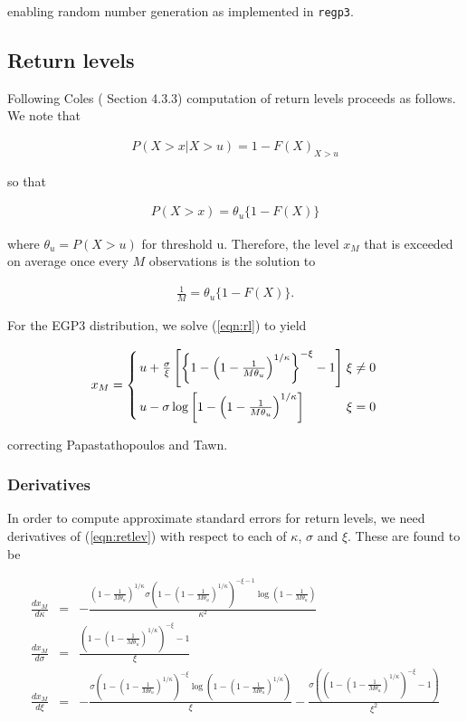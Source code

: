 \documentclass[a4paper]{article}\usepackage[]{graphicx}\usepackage[]{color}
\begin{document}
enabling random number generation as implemented in {\tt regp3}.

\subsection{Return levels}
Following Coles (\cite{coles} Section 4.3.3) computation of return levels proceeds
as follows. We note that

\begin{eqnarray*}
P(X > x | X > u) = 1 - F(X)_{X > u}
\end{eqnarray*}

so that

\begin{eqnarray*}
P(X > x) = \theta_u\{1 - F(X)\}
\end{eqnarray*}

where $\theta_u = P(X > u)$ for threshold u. Therefore, the level $x_M$ that is
exceeded on average once every $M$ observations is the solution to

\begin{eqnarray}
\frac{1}{M} = \theta_u\{1 - F(X)\} \label{eqn:rl}.
\end{eqnarray}

For the EGP3 distribution, we solve (\ref{eqn:rl}) to yield

\begin{eqnarray}
x_M = \left\{ \arraycolsep=1.4pt\def\arraystretch{2.2} %
      \begin{array}{ll}
      u + \frac{\sigma}{\xi}\left[\left\{1 - \left( 1 - \frac{1}{M\theta_u}\right)^{1/\kappa}\right\}^{-\xi} - 1\right] & \xi \ne 0 \label{eqn:retlev}\\
      u - \sigma\log\left[1 - \left(1 - \frac{1}{M\theta_u}\right)^{1/\kappa}\right] & \xi = 0
      \end{array}
      \right.
\end{eqnarray}

correcting Papastathopoulos and Tawn.

\subsubsection{Derivatives}
In order to compute approximate standard errors for return levels, we need derivatives
of (\ref{eqn:retlev}) with respect to each of $\kappa$, $\sigma$ and $\xi$. These
are found to be

\begin{eqnarray*}
\frac{dx_M}{d\kappa} &=& -\frac{\left( 1 - \frac{1}{M\theta_u}\right)^{1/\kappa} \sigma\left( 1 - \left( 1 - \frac{1}{M\theta_u}\right)^{1/\kappa}\right)^{-\xi -1}\log\left( 1 - \frac{1}{M\theta_u}\right)}{\kappa^2}\\
\frac{dx_M}{d\sigma} &=& \frac{\left(1 - \left( 1 - \frac{1}{M\theta_u}\right)^{1/\kappa}\right)^{-\xi} -1}{\xi}\\
\frac{dx_M}{d\xi} &=& -\frac{\sigma\left(1 - \left( 1 - \frac{1}{M\theta_u}\right)^{1/\kappa}\right)^{-\xi}\log\left(1 - \left( 1 - \frac{1}{M\theta_u}\right)^{1/\kappa}\right)}{\xi} - \frac{\sigma\left(\left(1 - \left( 1 - \frac{1}{M\theta_u}\right)^{1/\kappa}\right)^{-\xi} -1\right)}{\xi^2}
\end{eqnarray*}
\end{document}

